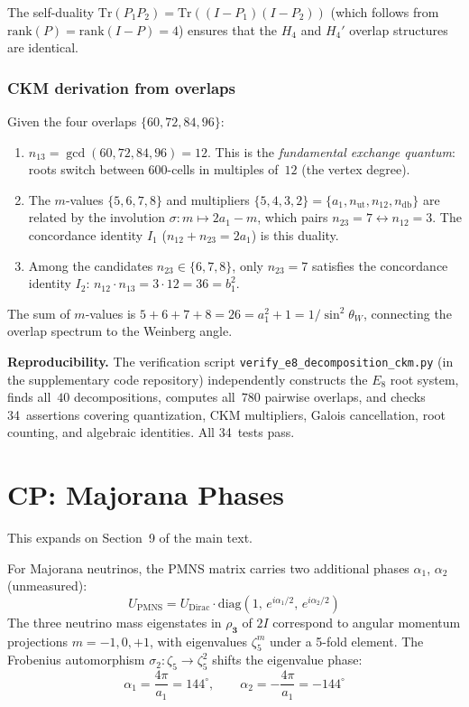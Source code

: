 \documentclass[12pt,a4paper]{article}
\theoremstyle{definition}
\begin{document}
The self-duality $\mathrm{Tr}(P_1 P_2) = \mathrm{Tr}((I-P_1)(I-P_2))$ (which follows from $\mathrm{rank}(P) = \mathrm{rank}(I-P) = 4$) ensures that the $H_4$ and $H_4'$ overlap structures are identical.

\subsubsection{CKM derivation from overlaps}

Given the four overlaps $\{60, 72, 84, 96\}$:
\begin{enumerate}
\item $n_{13} = \gcd(60, 72, 84, 96) = 12$.  This is the \emph{fundamental exchange quantum}: roots switch between 600-cells in multiples of~$12$ (the vertex degree).
\item The $m$-values $\{5, 6, 7, 8\}$ and multipliers $\{5, 4, 3, 2\} = \{a_1, n_{\text{ut}}, n_{12}, n_{\text{db}}\}$ are related by the involution $\sigma\colon m \mapsto 2a_1 - m$, which pairs $n_{23} = 7 \leftrightarrow n_{12} = 3$.  The concordance identity $I_1$ ($n_{12} + n_{23} = 2a_1$) is this duality.
\item Among the candidates $n_{23} \in \{6, 7, 8\}$, only $n_{23} = 7$ satisfies the concordance identity $I_2$: $n_{12} \cdot n_{13} = 3 \cdot 12 = 36 = b_1^2$.
\end{enumerate}
The sum of $m$-values is $5+6+7+8 = 26 = a_1^2 + 1 = 1/\sin^2\theta_W$, connecting the overlap spectrum to the Weinberg angle.

\textbf{Reproducibility.}  The verification script \texttt{verify\_e8\_decomposition\_ckm.py} (in the supplementary code repository) independently constructs the $E_8$ root system, finds all~$40$ decompositions, computes all~$780$ pairwise overlaps, and checks 34~assertions covering quantization, CKM multipliers, Galois cancellation, root counting, and algebraic identities.  All 34~tests pass.

\section{CP: Majorana Phases}
\label{sec:S-cp}

This expands on Section~9 of the main text.

For Majorana neutrinos, the PMNS matrix carries two additional phases $\alpha_1$, $\alpha_2$ (unmeasured):
\begin{equation}
U_{\text{PMNS}} = U_{\text{Dirac}} \cdot \mathrm{diag}(1,\, e^{i\alpha_1/2},\, e^{i\alpha_2/2})
\end{equation}
The three neutrino mass eigenstates in $\rho_{\mathbf{3}}$ of $2I$ correspond to angular momentum projections $m = -1, 0, +1$, with eigenvalues $\zeta_5^m$ under a 5-fold element.  The Frobenius automorphism $\sigma_2\colon \zeta_5 \to \zeta_5^2$ shifts the eigenvalue phase:
\begin{equation}
\alpha_1 = \frac{4\pi}{a_1} = 144^\circ, \qquad \alpha_2 = -\frac{4\pi}{a_1} = -144^\circ
\end{equation}
\end{document}
